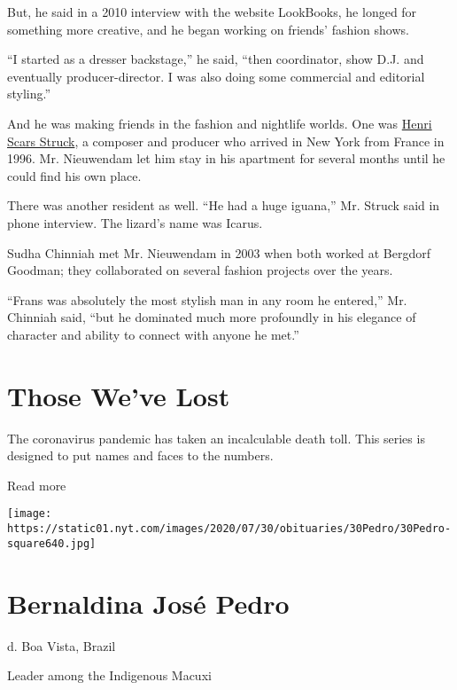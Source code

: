 But, he said in a 2010 interview with the website LookBooks, he longed
for something more creative, and he began working on friends' fashion
shows.

``I started as a dresser backstage,'' he said, ``then coordinator, show
D.J. and eventually producer-director. I was also doing some commercial
and editorial styling.''

And he was making friends in the fashion and nightlife worlds. One was
\href{https://www.henriscarsstruck.com/about}{Henri Scars Struck}, a
composer and producer who arrived in New York from France in 1996. Mr.
Nieuwendam let him stay in his apartment for several months until he
could find his own place.

There was another resident as well. ``He had a huge iguana,'' Mr. Struck
said in phone interview. The lizard's name was Icarus.

Sudha Chinniah met Mr. Nieuwendam in 2003 when both worked at Bergdorf
Goodman; they collaborated on several fashion projects over the years.

``Frans was absolutely the most stylish man in any room he entered,''
Mr. Chinniah said, ``but he dominated much more profoundly in his
elegance of character and ability to connect with anyone he met.''

\href{https://www.nytimes.com/interactive/2020/obituaries/people-died-coronavirus-obituaries.html?action=click\&pgtype=Article\&state=default\&region=BELOW_MAIN_CONTENT\&context=covid_obits_promo}{}

\hypertarget{those-weve-lost}{%
\section{Those We've Lost}\label{those-weve-lost}}

The coronavirus pandemic has taken an incalculable death toll. This
series is designed to put names and faces to the numbers.

Read more

\texttt{[image: https://static01.nyt.com/images/2020/07/30/obituaries/30Pedro/30Pedro-square640.jpg]}

\hypertarget{bernaldina-josuxe9-pedro}{%
\section{Bernaldina José Pedro}\label{bernaldina-josuxe9-pedro}}

d. Boa Vista, Brazil

Leader among the Indigenous Macuxi

